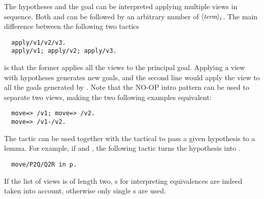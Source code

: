 The hypotheses and the goal can be interpreted applying multiple views in
sequence. Both  and  can be followed by an arbitrary number
of \C{/}$\langle\mbox{\itshape\rmfamily\small term}\rangle_i$. The main difference between the following two tactics
\begin{lstlisting}
  apply/v1/v2/v3.
  apply/v1; apply/v2; apply/v3.
\end{lstlisting}
is that the former applies all the views to the principal goal.
Applying a view with hypotheses generates new goals, and the second line
would apply the view  to all the goals generated by .
Note that the NO-OP intro pattern \C{-} can be used to separate two
views, making the two following examples equivalent:
\begin{lstlisting}
  move=> /v1; move=> /v2.
  move=> /v1-/v2.
\end{lstlisting}

The tactic  can be used together with the 
tactical to pass a given hypothesis to a lemma. For example, if
 and , the following
tactic turns the hypothesis  into .
\begin{lstlisting}
  move/P2Q/Q2R in p.
\end{lstlisting}

If the list of views is of length two, s for interpreting
equivalences are indeed taken into account, otherwise only single
s are used.
